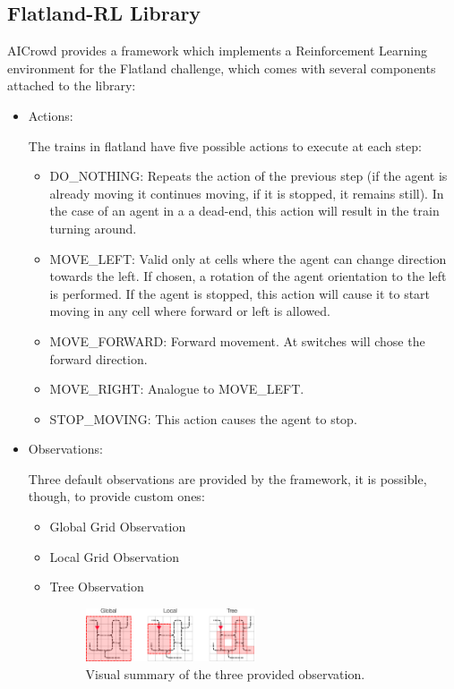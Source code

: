 \documentclass[12pt]{article}
\begin{document}
\subsection{Flatland-RL Library}\label{RL-library}

AICrowd provides a framework which implements a Reinforcement Learning environment for the Flatland challenge, which comes with several components attached to the library:
\begin{itemize}
    \item Actions: 
    
    The trains in flatland have five possible actions to execute at each step:
        \begin{itemize}
            \item DO\_NOTHING: Repeats the action of the previous step (if the agent is already moving it continues moving, if it is stopped, it remains still). In the case of an agent in a a dead-end, this action will result in the train turning around.
            \item MOVE\_LEFT: Valid only at cells where the agent can change direction towards the left. If chosen, a rotation of the agent orientation to the left is performed. If the agent is stopped, this action will cause it to start moving in any cell where forward or left is allowed.
            \item MOVE\_FORWARD: Forward movement. At switches will chose the forward direction.
            \item MOVE\_RIGHT: Analogue to MOVE\_LEFT.
            \item STOP\_MOVING: This action causes the agent to stop.   
        \end{itemize}

    \item Observations:
    
    Three default observations are provided by the framework, it is possible, though, to provide custom ones:
    \begin{itemize}
        \item Global Grid Observation 
        \item Local Grid Observation
        \item Tree Observation
        \begin{figure}[H]
        \centering
        \includegraphics[width=0.5\textwidth]{res/obs.png}
        \caption{\label{fig:Views}Visual summary of the three provided observation.}
        \end{figure}
    \end{itemize}
    

\end{itemize}
\end{document}
